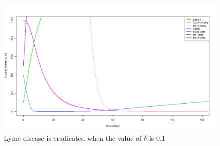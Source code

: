 \documentclass[12pt, centerh1]{article}
\begin{document}
\begin{figure}[h]
    \centering
    \includegraphics[scale = 0.4]{figures/intervention_eradicated.png}
    \caption{Lyme disease is eradicated when the value of $\delta$ is 0.1}
    \label{fig:eradicated}
\end{figure}
\end{document}
